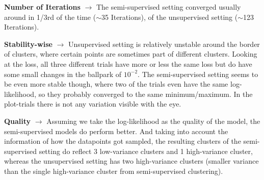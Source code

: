 \begin{answer}

    \textbf{Number of Iterations} $\rightarrow$ The semi-supervised setting converged usually around in 1/3rd of the time ($\sim$35 Iterations), of the unsupervised setting ($\sim$123 Iterations).


    \textbf{Stability-wise} $\rightarrow$ Unsupervised setting is relatively unstable around the border of clusters, where certain points are sometimes part of different clusters. Looking at the loss, all three different trials have more or less the same loss but do have some small changes in the ballpark of $10^{-2}$. The semi-supervised setting seems to be even more stable though, where two of the trials even have the same log-likelihood, so they probably converged to the same minimum/maximum. In the plot-trials there is not any variation visible with the eye.

    
    \textbf{Quality} $\rightarrow$ Assuming we take the log-likelihood as the quality of the model, the semi-supervised models do perform better. And taking into account the information of how the datapoints got sampled, the resulting clusters of the semi-supervised setting do reflect 3 low-variance clusters and 1 high-variance cluster, whereas the unsupervised setting has two high-variance clusters (smaller variance than the single high-variance cluster from semi-supervised clustering).
\end{answer}
